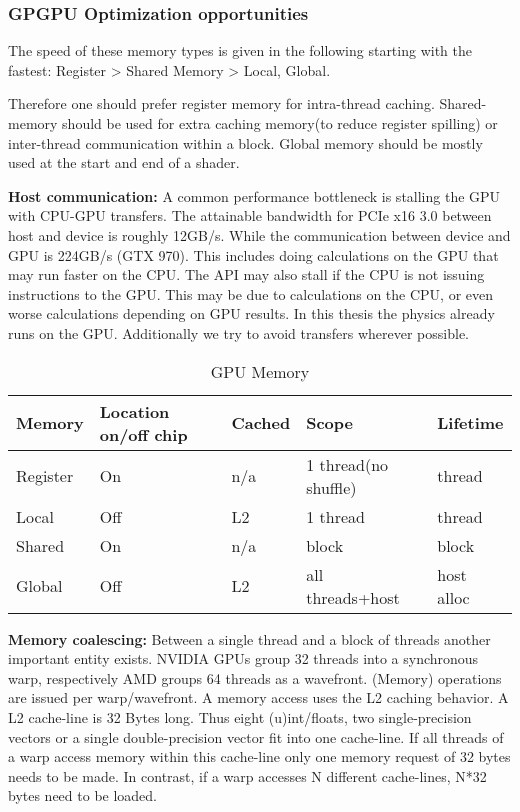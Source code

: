 \documentclass[m,times]{cgMA}
\begin{document}
\subsubsection {GPGPU Optimization opportunities}\label{sec:optim}
The speed of these memory types is given in the following starting with the fastest:
Register > Shared Memory > Local, Global.

Therefore one should prefer register memory for intra-thread caching. Shared-memory should be used for extra caching memory(to reduce register spilling) or inter-thread communication within a block. Global memory should be mostly used at the start and end of a shader.

\textbf{Host communication:} A common performance bottleneck is stalling the GPU with CPU-GPU transfers. The attainable bandwidth for PCIe x16 3.0 between host and device is roughly 12GB/s. While the communication between device and GPU is 224GB/s (GTX 970). This includes doing calculations on the GPU that may run faster on the CPU. The API may also stall if the CPU is not issuing instructions to the GPU. This may be due to calculations on the CPU, or even worse calculations depending on GPU results. In this thesis the physics already runs on the GPU. Additionally we try to avoid transfers wherever possible.

\begin{table}
  \begin{tabular}{ | l | l | l | l | l |}    \hline
    Memory       &Location on/off chip   &Cached   &Scope                &Lifetime   \\\hline
    Register     &On                     &n/a      &1 thread(no shuffle) &thread     \\\hline
    Local        &Off                    &L2       &1 thread             &thread     \\\hline
    Shared       &On                     &n/a      &block                &block      \\\hline
    Global       &Off                    &L2       &all threads+host     &host alloc \\
    \hline
  \end{tabular}
\caption{GPU Memory \cite{NVIDIA:BEST:PRACTICE}}
\end{table}
\textbf{Memory coalescing:} Between a single thread and a block of threads another important entity exists. NVIDIA GPUs group 32 threads into a synchronous warp, respectively AMD groups 64 threads as a wavefront. (Memory) operations are issued per warp/wavefront. A memory access uses the L2 caching behavior. A L2 cache-line is 32 Bytes long. Thus eight (u)int/floats, two single-precision vectors or a single double-precision vector fit into one cache-line. If all threads of a warp access memory within this cache-line only one memory request of 32 bytes needs to be made. In contrast, if a warp accesses N different cache-lines, N*32 bytes need to be loaded.
\end{document}
